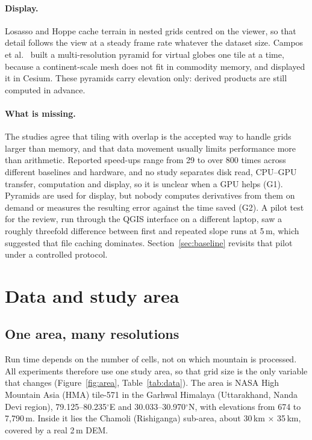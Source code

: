 \documentclass[11pt,a4paper]{article}
\begin{document}
\paragraph{Display.} Losasso and Hoppe \cite{clipmaps} cache terrain in nested grids centred on the viewer, so that
detail follows the view at a steady frame rate whatever the dataset size. Campos et al.\ \cite{campos} built a
multi-resolution pyramid for virtual globes one tile at a time, because a continent-scale mesh does not fit in
commodity memory, and displayed it in Cesium. These pyramids carry elevation only: derived products are still
computed in advance.

\paragraph{What is missing.} The studies agree that tiling with overlap is the accepted way to handle grids larger
than memory, and that data movement usually limits performance more than arithmetic. Reported speed-ups range from
29 to over 800 times across different baselines and hardware, and no study separates disk read, CPU--GPU transfer,
computation and display, so it is unclear when a GPU helps (G1). Pyramids are used for display, but nobody computes
derivatives from them on demand or measures the resulting error against the time saved (G2). A pilot test for the
review, run through the QGIS interface on a different laptop, saw a roughly threefold difference between first and
repeated slope runs at 5\,m, which suggested that file caching dominates. Section~\ref{sec:baseline} revisits that
pilot under a controlled protocol.

\section{Data and study area}\label{sec:data}
\subsection{One area, many resolutions}
Run time depends on the number of cells, not on which mountain is processed. All experiments therefore use one
study area, so that grid size is the only variable that changes (Figure~\ref{fig:area}, Table~\ref{tab:data}). The
area is NASA High Mountain Asia (HMA) tile-571 in the Garhwal Himalaya (Uttarakhand, Nanda Devi region),
79.125--80.235$^\circ$E and 30.033--30.970$^\circ$N, with elevations from 674 to 7{,}790\,m. Inside it lies the
Chamoli (Rishiganga) sub-area, about 30\,km $\times$ 35\,km, covered by a real 2\,m DEM.
\end{document}
